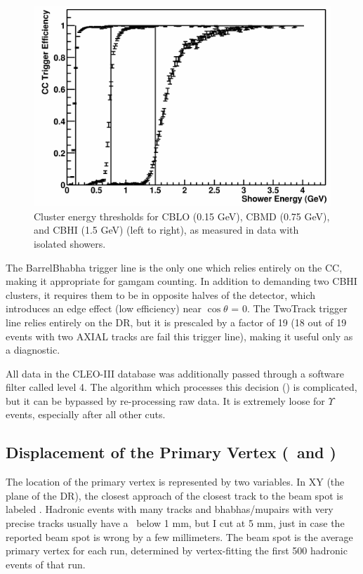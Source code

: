 \begin{figure}[p]
  \begin{center}
    \includegraphics[width=\linewidth, clip=true]{plots/trigger_topher}
  \end{center}
  \caption{\label{trigger_topher} Cluster energy thresholds for CBLO
  (0.15 GeV), CBMD (0.75 GeV), and CBHI (1.5 GeV) (left to right), as
  measured in data with isolated showers.}
\end{figure}

The BarrelBhabha trigger line is the only one which relies entirely on
the CC, making it appropriate for gamgam counting.  In addition to
demanding two CBHI clusters, it requires them to be in opposite halves
of the detector, which introduces an edge effect (low efficiency) near
$\cos\theta$ = 0.  The TwoTrack trigger line relies entirely on the
DR, but it is prescaled by a factor of 19 (18 out of 19 events with
two AXIAL tracks are fail this trigger line), making it useful only as
a diagnostic.

All data in the CLEO-III database was additionally passed through a
software filter called level 4.  The algorithm which processes this
decision (\lfourdec) is complicated, but it can be bypassed by
re-processing raw data.  It is extremely loose for $\Upsilon$ events,
especially after all other cuts.

\subsection{Displacement of the Primary Vertex (\dxy\ and \dz)}

The location of the primary vertex is represented by two variables.
In XY (the plane of the DR), the closest approach of the closest track
to the beam spot is labeled \dxy.  Hadronic events with many tracks
and bhabhas/mupairs with very precise tracks usually have a \dxy\ below
1 mm, but I cut at 5 mm, just in case the reported beam spot is wrong
by a few millimeters.  The beam spot is the average primary vertex for
each run, determined by vertex-fitting the first 500 hadronic events
of that run.

